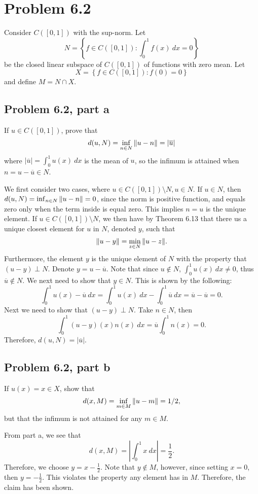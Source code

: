 \newpage
\section{Problem 6.2}
Consider $C([0, 1])$ with the sup-norm. Let 
\[N = \left \{ f \in C([0, 1]) : \int_0^1 f(x) \ dx = 0\right\}\]
be the closed linear subspace of $C([0, 1])$ of functions with zero mean. Let 
\[X = \left\{ f \in C([0, 1]) : f(0) = 0\right\}\]
and define $M = N \cap X$. 
\subsection{Problem 6.2, part a}
If $u \in C([0, 1])$, prove that 
\[d(u, N) = \inf_{n \in N} \norm{u - n} = |\overline{u}|\]
where $|\overline{u}| = \int_0^1 u(x) \ dx$ is the mean of $u$, so the infimum is attained when $n = u - \overline{u} \in N$. 
\partbreak
\begin{solution}

    We first consider two cases, where $u \in C([0, 1])\setminus N, u \in N$. If $u \in N$, then $d(u, N) = \inf_{n \in N} \norm{u - n} = 0$, since the norm is positive function, and equals zero only when the term inside is equal zero. This implies $n = u$ is the unique element. If $u \in C([0, 1]) \setminus N$, we then have by Theorem 6.13 that there us a unique closest element for $u$ in $N$, denoted $y$, such that 
    \[\norm{u - y} = \min_{z \in N} \norm{u - z}.\]
    Furthermore, the element $y$ is the unique element of $N$ with the property that $(u - y) \perp N$. Denote $y = u - \overline{u}$. Note that since $u \not \in N$, $\int_0^1 u(x) \ dx \neq 0$, thus $\overline{u} \not \in N$. We next need to show that $y \in N$. This is shown by the following:
    \[\int_0^1 u(x) - \overline{u} \ dx = \int_0^1 u(x) \ dx - \int_0^1\overline{u} \ dx = \overline{u} - \overline{u} = 0.\]
    Next we need to show that $(u - y) \perp N$. Take $n \in N$, then
    \[\int_0^1 (u - y)(x) n(x) \ dx = \overline{u} \int_0^1 n(x) = 0.\]
    Therefore, $d(u, N) = |\overline{u}|$.
\end{solution}


\newpage
\subsection{Problem 6.2, part b}
If $u(x) = x \in X$, show that
\[d(x, M) = \inf_{m \in M}\norm{u - m} = 1/2,\]
but that the infimum is not attained for any $m \in M$.
\partbreak
\begin{solution}

    From part a, we see that 
    \[d(x, M) = \left|\int_0^1 x \ dx\right| = \frac{1}{2}.\]
    Therefore, we choose $y = x - \frac{1}{2}$. Note that $y \not\in M$, however, since setting $x =0$, then $y = -\frac{1}{2}$. This violates the property any element has in $M$. Therefore, the claim has been shown.
\end{solution}

